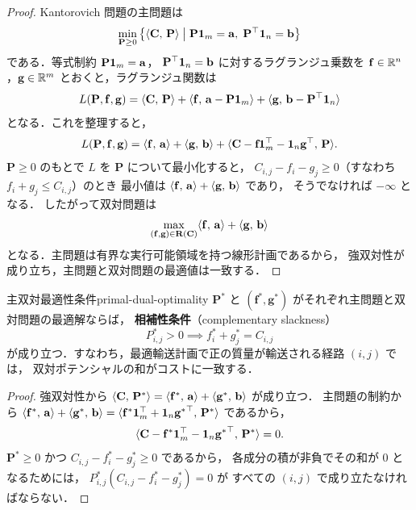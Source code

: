 \begin{proof}
  Kantorovich 問題の主問題は
  \[
    \min_{\mathbf{P} \geq 0} \left\{
    \langle \mathbf{C},\, \mathbf{P} \rangle \;\middle|\;
    \mathbf{P} \mathbf{1}_m = \mathbf{a}, \;
    \mathbf{P}^\top \mathbf{1}_n = \mathbf{b}
    \right\}
  \]
  である．等式制約 $\mathbf{P} \mathbf{1}_m = \mathbf{a}$，
  $\mathbf{P}^\top \mathbf{1}_n = \mathbf{b}$ に対するラグランジュ乗数を
  $\mathbf{f} \in \mathbb{R}^n$，$\mathbf{g} \in \mathbb{R}^m$ とおくと，ラグランジュ関数は
  \[
    L(\mathbf{P}, \mathbf{f}, \mathbf{g})
    = \langle \mathbf{C},\, \mathbf{P} \rangle
    + \langle \mathbf{f},\, \mathbf{a} - \mathbf{P} \mathbf{1}_m \rangle
    + \langle \mathbf{g},\, \mathbf{b} - \mathbf{P}^\top \mathbf{1}_n \rangle
  \]
  となる．これを整理すると，
  \[
    L(\mathbf{P}, \mathbf{f}, \mathbf{g})
    = \langle \mathbf{f},\, \mathbf{a} \rangle + \langle \mathbf{g},\, \mathbf{b} \rangle
    + \langle \mathbf{C} - \mathbf{f} \mathbf{1}_m^\top - \mathbf{1}_n \mathbf{g}^\top,\, \mathbf{P} \rangle.
  \]
  $\mathbf{P} \geq 0$ のもとで $L$ を $\mathbf{P}$ について最小化すると，
  $C_{i,j} - f_i - g_j \geq 0$（すなわち $f_i + g_j \leq C_{i,j}$）のとき
  最小値は $\langle \mathbf{f},\, \mathbf{a} \rangle + \langle \mathbf{g},\, \mathbf{b} \rangle$ であり，
  そうでなければ $-\infty$ となる．
  したがって双対問題は
  \[
    \max_{(\mathbf{f}, \mathbf{g}) \in \mathbf{R}(\mathbf{C})}
    \langle \mathbf{f},\, \mathbf{a} \rangle + \langle \mathbf{g},\, \mathbf{b} \rangle
  \]
  となる．主問題は有界な実行可能領域を持つ線形計画であるから，
  強双対性が成り立ち，主問題と双対問題の最適値は一致する．
\end{proof}

\begin{proposition}{主双対最適性条件}{primal-dual-optimality}
  $\mathbf{P}^*$ と $(\mathbf{f}^*, \mathbf{g}^*)$ がそれぞれ主問題と双対問題の最適解ならば，
  \textbf{相補性条件}（complementary slackness）
  \[
    P^*_{i,j} > 0 \implies f^*_i + g^*_j = C_{i,j}
  \]
  が成り立つ．すなわち，最適輸送計画で正の質量が輸送される経路 $(i, j)$ では，
  双対ポテンシャルの和がコストに一致する．
\end{proposition}

\begin{proof}
  強双対性から $\langle \mathbf{C},\, \mathbf{P}^* \rangle
  = \langle \mathbf{f}^*,\, \mathbf{a} \rangle + \langle \mathbf{g}^*,\, \mathbf{b} \rangle$ が成り立つ．
  主問題の制約から
  $\langle \mathbf{f}^*,\, \mathbf{a} \rangle + \langle \mathbf{g}^*,\, \mathbf{b} \rangle
  = \langle \mathbf{f}^* \mathbf{1}_m^\top + \mathbf{1}_n {\mathbf{g}^*}^\top,\, \mathbf{P}^* \rangle$ であるから，
  \[
    \langle \mathbf{C} - \mathbf{f}^* \mathbf{1}_m^\top - \mathbf{1}_n {\mathbf{g}^*}^\top,\, \mathbf{P}^* \rangle = 0.
  \]
  $\mathbf{P}^* \geq 0$ かつ $C_{i,j} - f^*_i - g^*_j \geq 0$ であるから，
  各成分の積が非負でその和が $0$ となるためには，
  $P^*_{i,j} (C_{i,j} - f^*_i - g^*_j) = 0$ が
  すべての $(i, j)$ で成り立たなければならない．
\end{proof}

